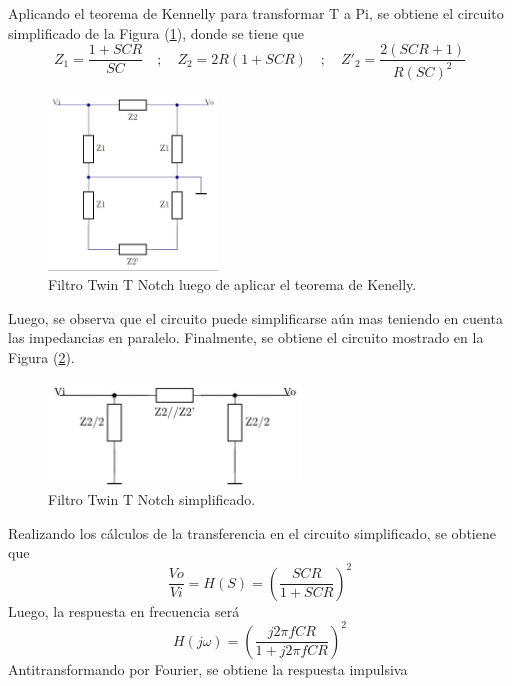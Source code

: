 \documentclass[a4paper]{article}
\begin{document}
Aplicando el teorema de Kennelly para transformar T a Pi, se obtiene el circuito simplificado de la Figura (\ref{fig:filtrosimplificado}), donde se tiene que
\[Z_1=\frac{1+SCR}{SC}\hspace{1em};\hspace{1em} Z_2=2R(1+SCR) \hspace{1em};\hspace{1em} Z'_2=\frac{2(SCR+1)}{R(SC)^2}\]

\begin{figure}[H]
	\centering
	\includegraphics[width=0.4\textwidth, trim={0 0.1cm  0 0.1cm},clip]{ej1kennellly.jpg}
\caption{Filtro Twin T Notch luego de aplicar el teorema de Kenelly.}
	\label{fig:filtrosimplificado}
\end{figure}

Luego, se observa que el circuito puede simplificarse aún mas teniendo en cuenta las impedancias en paralelo. Finalmente, se obtiene el circuito mostrado en la Figura (\ref{fig:filtrofinal}).

\begin{figure}[H]
	\centering
	\includegraphics[width=0.6\textwidth]{ej1simplificado.jpg}
\caption{Filtro Twin T Notch simplificado.}
	\label{fig:filtrofinal}
\end{figure}

Realizando los cálculos de la transferencia en el circuito simplificado, se obtiene que
\[ \frac{Vo}{Vi}=H(S)=\left( \frac{SCR}{1+SCR} \right)^2 \] 
Luego, la respuesta en frecuencia será
\[H(j\omega)=\left( \frac{j 2\pi f CR}{1+ j2\pi f CR} \right)^2 \]
Antitransformando por Fourier, se obtiene la respuesta impulsiva
\end{document}
